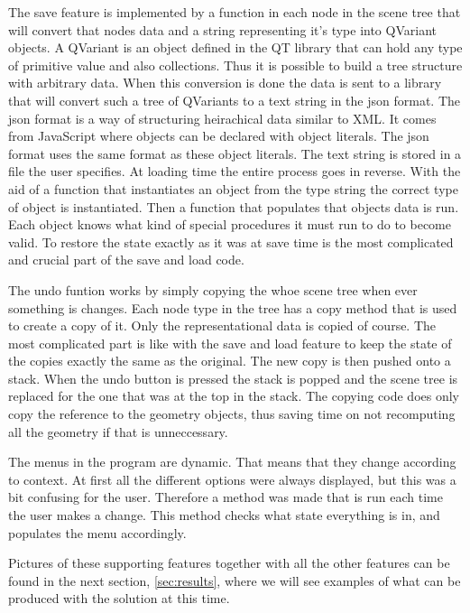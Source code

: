 \documentclass[a4paper,12pt]{report}
\newcommand{\secref}[1]{\autoref{#1}}
\begin{document}
The save feature is implemented by a function in each node in the scene tree that will convert that nodes data and a string representing it's type into QVariant objects. A QVariant is an object defined in the QT library that can hold any type of primitive value and also collections. Thus it is possible to build a tree structure with arbitrary data. When this conversion is done the data is sent to a library that will convert such a tree of QVariants to a text string in the json format. The json format is a way of structuring heirachical data similar to XML. It comes from JavaScript where objects can be declared with object literals. The json format uses the same format as these object literals. The text string is stored in a file the user specifies. At loading time the entire process goes in reverse. With the aid of a function that instantiates an object from the type string the correct type of object is instantiated. Then a function that populates that objects data is run. Each object knows what kind of 
special procedures it must run to do to become valid. To restore the state exactly as it was at save time is the most complicated and crucial part of the save and load code.

The undo funtion works by simply copying the whoe scene tree when ever something is changes. Each node type in the tree has a copy method that is used to create a copy of it. Only the representational data is copied of course. The most complicated part is like with the save and load feature to keep the state of the copies exactly the same as the original. The new copy is then pushed onto a stack. When the undo button is pressed the stack is popped and the scene tree is replaced for the one that was at the top in the stack. The copying code does only copy the reference to the geometry objects, thus saving time on not recomputing all the geometry if that is unneccessary.

The menus in the program are dynamic. That means that they change according to context. At first all the different options were always displayed, but this was a bit confusing for the user. Therefore a method was made that is run each time the user makes a change. This method checks what state everything is in, and populates the menu accordingly.

Pictures of these supporting features together with all the other features can be found in the next section, \secref{sec:results}, where we will see examples of what can be produced with the solution at this time.

\clearpage
\end{document}
